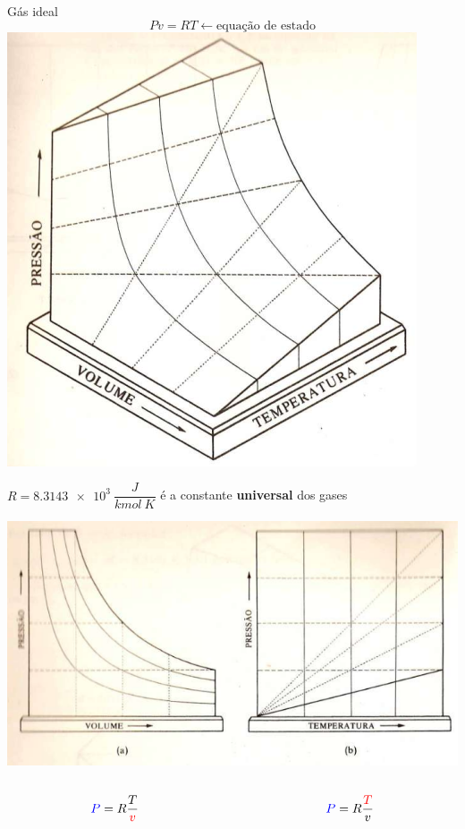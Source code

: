 \begin{frame}{Gás ideal}
\[
    Pv = RT \leftarrow \text{equação de estado}
\]
\centering
\includegraphics[height=7.5cm-60pt]{images/pvt-ideal.png}

\pause

\(R=\SI{8.3143e3}{\dfrac{J}{kmol~K}}\) é a constante \textbf{universal} dos gases 
\end{frame}

\begin{frame}
    \centering
    \includegraphics[height=0.8\textheight]{images/Captura de tela de 2023-04-03 13-42-22.png}
    \begin{columns}
        \begin{column}{0.4\textwidth}
            \[
                \textcolor{blue}{P}=R\frac{T}{\textcolor{red}{v}}
            \]
        \end{column}

        \begin{column}{0.4\textwidth}
            \[
                \textcolor{blue}{P}=R\frac{\textcolor{red}{T}}{v}
            \]
        \end{column}
    \end{columns}
\end{frame}

